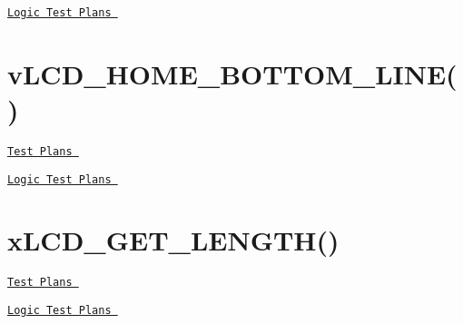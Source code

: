  \href{vLCD_HOME_TOP_LINE_LOGIC.pdf}{\tt Logic Test Plans }\hypertarget{_test_plans_bottomhome}{}\section{v\-L\-C\-D\-\_\-\-H\-O\-M\-E\-\_\-\-B\-O\-T\-T\-O\-M\-\_\-\-L\-I\-N\-E()}\label{_test_plans_bottomhome}
\href{vLCD_HOME_BOTTOM_LINE_TESTPLAN.pdf}{\tt Test Plans } \par
 \href{vLCD_HOME_BOTTOM_LINE_LOGIC.pdf}{\tt Logic Test Plans }\hypertarget{_test_plans_getlength}{}\section{x\-L\-C\-D\-\_\-\-G\-E\-T\-\_\-\-L\-E\-N\-G\-T\-H()}\label{_test_plans_getlength}
\href{vLCD_PRINT_STRING_TESTPLAN.pdf}{\tt Test Plans } \par
 \href{vLCD_PRINT_STRING_LOGIC.pdf}{\tt Logic Test Plans } 